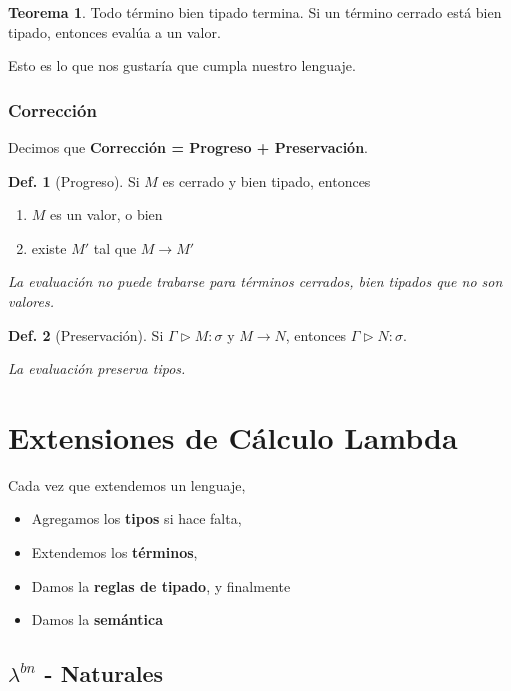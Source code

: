 \documentclass{report}
\theoremstyle{definition} %
\newtheorem{theorem}{Teorema}[chapter]
\newtheorem{definition}{Def.}[chapter]
\newcommand{\tipa}[3]{#1 \rhd #2 : #3} %
\newcommand{\Gtipa}[2]{\tipa{\Gamma}{#1}{#2}}
\newcommand{\lambdabn}{\lambda^{bn}}
\newcommand{\reduce}[2]{#1 \to #2}
\begin{document}
\begin{theorem}
    Todo término bien tipado termina. Si un término cerrado está bien tipado,
    entonces evalúa a un valor.
\end{theorem}

Esto es lo que nos gustaría que cumpla nuestro lenguaje.

\subsubsection{Corrección}\label{sec:correccion}

Decimos que \textbf{Corrección = Progreso + Preservación}.

\begin{definition}[Progreso]
    Si $M$ es cerrado y bien tipado, entonces
    \begin{enumerate}
        \item $M$ es un valor, o bien
        \item existe $M'$ tal que $\reduce{M}{M'}$
    \end{enumerate}

    \textit{La evaluación no puede trabarse para términos cerrados, bien tipados que no son valores.}
\end{definition}

\begin{definition}[Preservación]
    Si $\Gtipa{M}{\sigma}$ y $\reduce{M}{N}$, entonces $\Gtipa{N}{\sigma}$.

    \textit{La evaluación preserva tipos.}
\end{definition}

\section{Extensiones de Cálculo Lambda}

Cada vez que extendemos un lenguaje,

\begin{itemize}
    \item Agregamos los \textbf{tipos} si hace falta,
    \item Extendemos los \textbf{términos},
    \item Damos la \textbf{reglas de tipado}, y finalmente
    \item Damos la \textbf{semántica}
\end{itemize}

\subsection{$\lambdabn$ - Naturales}
\end{document}
